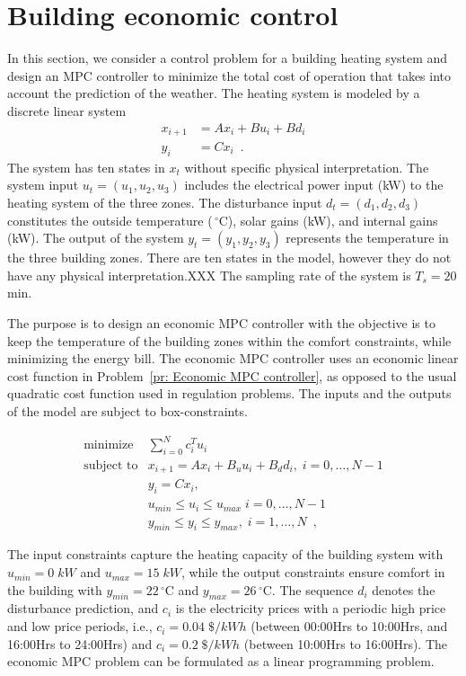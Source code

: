 \documentclass[openany]{now}
\begin{document}
\section{Building economic control}\label{SEC:example}
In this section, we consider a control problem for a building heating system and design an MPC controller to minimize the total cost of operation that takes into account the prediction of the weather. The heating system is modeled by a discrete linear system 
%
\begin{align*}
x_{i+1} &=Ax_i+Bu_i+Bd_i \\
y_i &=Cx_i\enspace.
\end{align*}
%
The system has ten states in $x_t$ without specific physical interpretation. The system input $u_t = (u_1, u_2, u_3)$ includes the electrical power input (kW) to the heating system of the three zones. The disturbance input $d_t = (d_1, d_2, d_3)$ constitutes the outside temperature ($\,^{\circ}\mathrm{C}$), solar gains (kW), and internal gains (kW). The output of the system $y_t = (y_1, y_2, y_3)$ represents the temperature in the three building zones. There are ten states in the model, however they do not have any physical interpretation.XXX The sampling rate of the system is $T_s = 20$ min. 

The purpose is to design an economic MPC controller with the objective is to keep the temperature of the building zones within the comfort constraints, while minimizing the energy bill. The economic MPC controller uses an economic linear cost function in Problem~\ref{pr: Economic MPC controller}, as opposed to the usual quadratic cost function used in regulation problems. The inputs and the outputs of the model are subject to box-constraints.

\begin{equation}\label{pr: Economic MPC controller}
  \begin{array}{ll}
        \mbox{minimize} & \sum^{N}_{i=0} c^{T}_{i}u_{i}  \\
    \mbox{subject to} & x_{i+1} = Ax_i+B_uu_i+B_dd_i, \; i = 0,\ldots,N-1 \\
    \quad & y_i = C x_i, \\
  \quad & u_{min} \leq u_i \leq u_{max} \; i = 0,\ldots,N-1 \\
  \quad & y_{min} \leq y_i \leq y_{max}, \; i = 1,\ldots,N\enspace,
  \end{array}
\end{equation}

The input constraints capture the heating capacity of the building system with $u_{min} = 0\; kW$ and $u_{max} = 15\; kW$, while the output constraints ensure comfort in the building with $y_{min} = 22 \,^{\circ}\mathrm{C}$ and $y_{max} = 26 \,^{\circ}\mathrm{C}$. The sequence $d_i$ denotes the disturbance prediction, and $c_i$ is the electricity prices with a periodic high price and low price periods, i.e., $c_i=0.04\; \$/kWh$ (between 00:00Hrs to 10:00Hrs, and 16:00Hrs to 24:00Hrs) and $c_i=0.2\; \$/kWh$ (between 10:00Hrs to 16:00Hrs). The economic MPC problem can be formulated as a linear programming problem.
\end{document}
